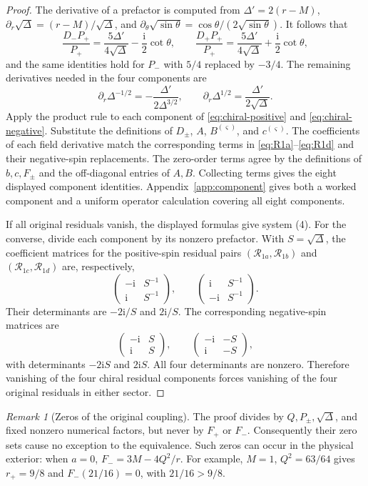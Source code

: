 \documentclass[11pt,a4paper]{article}
\numberwithin{equation}{section}
\theoremstyle{definition}
\theoremstyle{remark}
\newtheorem{remark}[theorem]{Remark}
\newcommand{\I}{\mathrm i}
\newcommand{\Res}{\mathcal R}
\newcommand{\mat}[1]{\begin{pmatrix}#1\end{pmatrix}}
\begin{document}
\begin{proof}
The derivative of a prefactor is computed from
\(\Delta'=2(r-M)\), \(\partial_r\sqrt\Delta=(r-M)/\sqrt\Delta\),
and \(\partial_\theta\sqrt{\sin\theta}
=\cos\theta/(2\sqrt{\sin\theta})\).  It follows that
\[
 \frac{D_-P_+}{P_+}
 =\frac{5\Delta'}{4\sqrt\Delta}-\frac{\I}{2}\cot\theta,\qquad
 \frac{D_+P_+}{P_+}
 =\frac{5\Delta'}{4\sqrt\Delta}+\frac{\I}{2}\cot\theta,
\]
and the same identities hold for \(P_-\) with \(5/4\) replaced by
\(-3/4\).  The remaining derivatives needed in the four components are
\[
 \partial_r\Delta^{-1/2}
 =-\frac{\Delta'}{2\Delta^{3/2}},\qquad
 \partial_r\Delta^{1/2}
 =\frac{\Delta'}{2\sqrt\Delta}.
\]
Apply the product rule to each component of
\eqref{eq:chiral-positive} and \eqref{eq:chiral-negative}.  Substitute
the definitions of \(D_\pm\), \(A\), \(B^{(\varsigma)}\), and
\(c^{(\varsigma)}\).  The coefficients of each field derivative match
the corresponding terms in \eqref{eq:R1a}--\eqref{eq:R1d} and their
negative-spin replacements.  The zero-order terms agree by the
definitions of \(b,c,F_\pm\) and the off-diagonal entries of \(A,B\).
Collecting terms gives the eight displayed component identities.
Appendix~\ref{app:component} gives both a worked component and a uniform
operator calculation covering all eight components.

If all original residuals vanish, the displayed formulas give system (4).
For the converse, divide each component by its nonzero prefactor.
With \(S=\sqrt\Delta\), the coefficient matrices for the positive-spin
residual pairs \((\Res_{1a},\Res_{1b})\) and
\((\Res_{1c},\Res_{1d})\) are, respectively,
\[
 \mat{-\I&S^{-1}\\ \I&S^{-1}},
 \qquad \mat{\I&S^{-1}\\ -\I&S^{-1}}.
\]
Their determinants are \(-2\I/S\) and \(2\I/S\).  The corresponding
negative-spin matrices are
\[
 \mat{-\I&S\\ \I&S},
 \qquad \mat{-\I&-S\\ \I&-S},
\]
with determinants \(-2\I S\) and \(2\I S\).  All four determinants
are nonzero.  Therefore vanishing of the four chiral residual components
forces vanishing of the four original residuals in either sector.
\end{proof}

\begin{remark}[Zeros of the original coupling]
\label{rem:coupling-zeros}
The proof divides by \(Q,P_\pm,\sqrt\Delta\), and fixed nonzero
numerical factors, but never by \(F_+\) or \(F_-\).  Consequently
their zero sets cause no exception to the equivalence.  Such zeros
can occur in the physical exterior: when \(a=0\),
\(F_-=3M-4Q^2/r\).  For example, \(M=1\), \(Q^2=63/64\) gives
\(r_+=9/8\) and \(F_-(21/16)=0\), with \(21/16>9/8\).
\end{remark}
\end{document}
